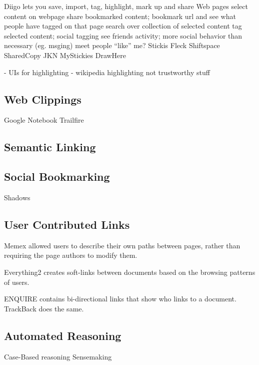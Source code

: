 \documentclass{chi2009}
\begin{document}
Diigo lets you save, import, tag, highlight, mark up and share Web pages
	select content on webpage
	share bookmarked content; bookmark url and see what people have tagged on that page
	search over collection of selected content
	tag selected content; social tagging
	see friends activity; more social behavior than necessary (eg. msging)
	meet people ``like'' me?
Stickis
Fleck
Shiftspace
SharedCopy
JKN
MyStickies
DrawHere

- UIs for highlighting
- wikipedia highlighting not trustworthy stuff

\subsection{Web Clippings}

Google Notebook
Trailfire

\subsection{Semantic Linking}

\subsection{Social Bookmarking}

Shadows

\subsection{User Contributed Links}

Memex allowed users to describe their own paths between pages, rather than requiring the page authors to modify them.

Everything2 creates soft-links between documents based on the browsing patterns of users.

ENQUIRE contains bi-directional links that show who links to a document. TrackBack does the same.

\subsection{Automated Reasoning}

Case-Based reasoning
Sensemaking
\end{document}
